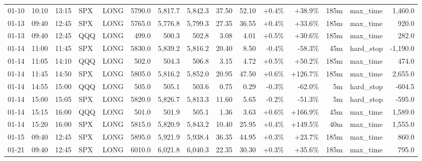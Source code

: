 \documentclass[11pt,a4paper,twoside]{article}
\begin{document}
\begin{landscape}
\begin{center}
\begin{longtable}{>{\color{txtmain}}l l l l l r r r r r r r r >{\color{txtmain}}l r}
01-10 & 10:10 & 13:15 & SPX & LONG & 5790.0 & 5,817.7 & 5,842.3 & 37.50 & 52.10 & \textcolor{wingreen}{+0.4\%} & \textcolor{wingreen}{+38.9\%} & 185m & max\_time & \textcolor{wingreen}{1,460.0} \\
01-13 & 09:40 & 12:45 & SPX & LONG & 5765.0 & 5,776.8 & 5,799.3 & 27.35 & 36.55 & \textcolor{wingreen}{+0.4\%} & \textcolor{wingreen}{+33.6\%} & 185m & max\_time & \textcolor{wingreen}{920.0} \\
01-13 & 09:40 & 12:45 & QQQ & LONG & 499.0 & 500.3 & 502.8 & 3.08 & 4.01 & \textcolor{wingreen}{+0.5\%} & \textcolor{wingreen}{+30.6\%} & 185m & max\_time & \textcolor{wingreen}{282.0} \\
01-14 & 11:00 & 11:45 & SPX & LONG & 5830.0 & 5,839.2 & 5,816.2 & 20.40 & 8.50 & \textcolor{lossred}{-0.4\%} & \textcolor{lossred}{-58.3\%} & 45m & hard\_stop & \textcolor{lossred}{-1,190.0} \\
01-14 & 11:05 & 14:10 & QQQ & LONG & 502.0 & 504.3 & 506.8 & 3.15 & 4.72 & \textcolor{wingreen}{+0.5\%} & \textcolor{wingreen}{+50.2\%} & 185m & max\_time & \textcolor{wingreen}{474.0} \\
01-14 & 11:45 & 14:50 & SPX & LONG & 5805.0 & 5,816.2 & 5,852.0 & 20.95 & 47.50 & \textcolor{wingreen}{+0.6\%} & \textcolor{wingreen}{+126.7\%} & 185m & max\_time & \textcolor{wingreen}{2,655.0} \\
01-14 & 14:55 & 15:00 & QQQ & LONG & 505.0 & 505.1 & 503.6 & 0.75 & 0.29 & \textcolor{lossred}{-0.3\%} & \textcolor{lossred}{-62.0\%} & 5m & hard\_stop & \textcolor{lossred}{-604.5} \\
01-14 & 15:00 & 15:05 & SPX & LONG & 5820.0 & 5,826.7 & 5,813.3 & 11.60 & 5.65 & \textcolor{lossred}{-0.2\%} & \textcolor{lossred}{-51.3\%} & 5m & hard\_stop & \textcolor{lossred}{-595.0} \\
01-14 & 15:15 & 16:00 & QQQ & LONG & 501.0 & 501.9 & 505.1 & 1.36 & 3.63 & \textcolor{wingreen}{+0.6\%} & \textcolor{wingreen}{+166.9\%} & 45m & max\_time & \textcolor{wingreen}{1,589.0} \\
01-14 & 15:20 & 16:00 & SPX & LONG & 5815.0 & 5,820.9 & 5,843.2 & 10.40 & 25.95 & \textcolor{wingreen}{+0.4\%} & \textcolor{wingreen}{+149.5\%} & 40m & max\_time & \textcolor{wingreen}{1,555.0} \\
01-15 & 09:40 & 12:45 & SPX & LONG & 5895.0 & 5,921.9 & 5,938.4 & 36.35 & 44.95 & \textcolor{wingreen}{+0.3\%} & \textcolor{wingreen}{+23.7\%} & 185m & max\_time & \textcolor{wingreen}{860.0} \\
01-21 & 09:40 & 12:45 & SPX & LONG & 6010.0 & 6,021.8 & 6,040.3 & 22.35 & 30.30 & \textcolor{wingreen}{+0.3\%} & \textcolor{wingreen}{+35.6\%} & 185m & max\_time & \textcolor{wingreen}{795.0} \\

\end{longtable}
\end{center}
\end{landscape}
\end{document}
